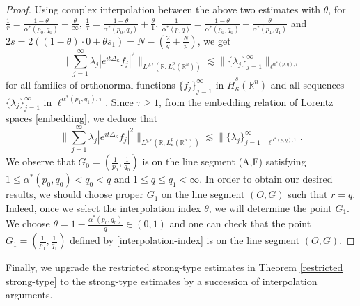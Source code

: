 \documentclass[a4paper,11pt, reqno]{amsart}
\numberwithin{equation}{section}
\theoremstyle{plain}
\theoremstyle{definition}
\theoremstyle{remark}
\begin{document}
\begin{proof}
Using complex interpolation between the above two estimates with $\theta$,   for $\frac{1}{r}=\frac{1-\theta}{\alpha^*(p_0,q_0)}+\frac{\theta}{\infty}$, $\frac{1}{\tau}=\frac{1-\theta}{\alpha^*(p_0,q_0)}+\frac{\theta}{1}$, $\frac{1}{\alpha^*(p,q)}=\frac{1-\theta}{\alpha^*(p_0,q_0)}+\frac{\theta}{\alpha^*(p_1,q_1)}$ and $2s=2\left((1-\theta)\cdot 0+\theta s_1\right)= N-\left(\frac{2}{q}+\frac{N}{p}\right)$, we get 
\begin{equation*}
 \bigg\|\sum_{j=1}^\infty \lambda_j|e^{it\Delta_\kappa}f_j|^2\bigg\|_{L^{q,r}(\mathbb{R}, L_\kappa^{p}(\mathbb{R}^n))}\lesssim \|\{\lambda_j\}^\infty_{j=1}\|_{\ell^{\alpha^*(p,q),\tau}}
\end{equation*}
  for all families of orthonormal functions $\{f_j\}_{j=1}^\infty$ in $\dot{H}_\kappa^{s}(\mathbb{R}^n)$ and all sequences $\{\lambda_j\}^\infty_{j=1}$ in $\ell^{\alpha^*(p_1,q_1),\tau}$.
Since $\tau\geq 1$,  from the embedding relation of Lorentz spaces \eqref{embedding}, we deduce that
\begin{equation*}
 \bigg\|\sum_{j=1}^\infty \lambda_j|e^{it\Delta_\kappa}f_j|^2\bigg\|_{L^{q,r}(\mathbb{R}, L_\kappa^{p}(\mathbb{R}^n))}\lesssim \|\{\lambda_j\}^\infty_{j=1}\|_{\ell^{\alpha^*(p,q),1}}. 
\end{equation*}
We observe that $G_0=(\frac{1}{p_0},\frac{1}{q_0})$ is on the line segment (A,F) satisfying $1\leq \alpha^*(p_0,q_0)<q_0<q$ and $1\leq q\leq q_1<\infty$. In order to obtain our desired results, we should choose proper $G_1$ on the line segment $(O,G)$ such that $r=q$. Indeed, once we select the interpolation index $\theta$, we will determine the point $G_1$. We choose $\theta=1-\frac{\alpha^*(p_0,q_0)}{q}\in (0,1)$ and one can check that the point $G_1=(\frac{1}{p_1},\frac{1}{q_1})$ defined by \eqref{interpolation-index} is on the line segment $(O,G)$.
\end{proof}

Finally, we upgrade the restricted strong-type estimates in Theorem \ref{restricted strong-type} to the strong-type estimates by a succession of interpolation arguments.
\end{document}
